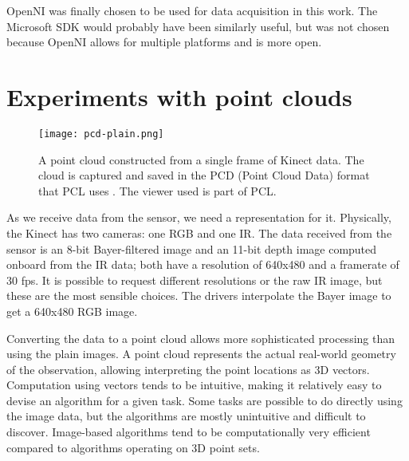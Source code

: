 OpenNI was finally chosen to be used for data acquisition in this work. The Microsoft SDK would probably have been similarly useful, but was not chosen because OpenNI allows for multiple platforms and is more open.

\section{Experiments with point clouds} \label{pcexperiments}

\begin{figure}
    \centering
    \texttt{[image: pcd-plain.png]}
    \caption{A point cloud constructed from a single frame of Kinect data. The cloud is captured and saved in the PCD (Point Cloud Data) format that PCL uses \citep{pcdspec}. The viewer used is part of PCL.}
    \label{fig:pcd-plain}
\end{figure}

As we receive data from the sensor, we need a representation for it. Physically, the Kinect has two cameras: one RGB and one IR. The data received from the sensor is an 8-bit Bayer-filtered image and an 11-bit depth image computed onboard from the IR data; both have a resolution of 640x480 and a framerate of 30 fps. It is possible to request different resolutions or the raw IR image, but these are the most sensible choices. The drivers interpolate the Bayer image to get a 640x480 RGB image.

Converting the data to a point cloud allows more sophisticated processing than using the plain images. A point cloud represents the actual real-world geometry of the observation, allowing interpreting the point locations as 3D vectors. Computation using vectors tends to be intuitive, making it relatively easy to devise an algorithm for a given task. Some tasks are possible to do directly using the image data, but the algorithms are mostly unintuitive and difficult to discover. Image-based algorithms tend to be computationally very efficient compared to algorithms operating on 3D point sets.

